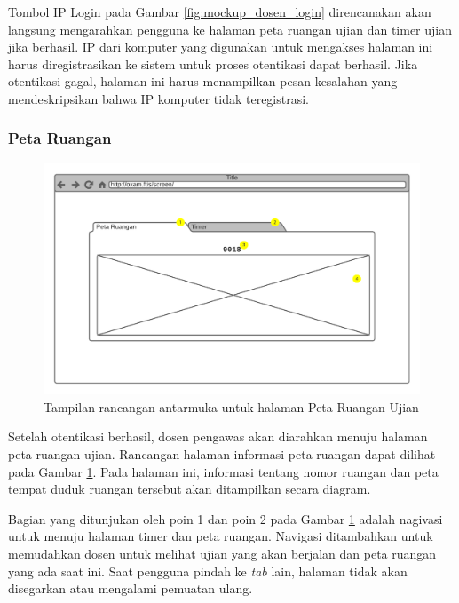     Tombol IP Login pada Gambar \ref{fig:mockup_dosen_login} direncanakan akan langsung mengarahkan 
    pengguna ke halaman peta ruangan ujian dan timer ujian jika berhasil. IP dari komputer yang
    digunakan untuk mengakses halaman ini harus diregistrasikan ke sistem untuk proses otentikasi
    dapat berhasil. Jika otentikasi gagal, halaman ini harus menampilkan pesan kesalahan yang
    mendeskripsikan bahwa IP komputer tidak teregistrasi.
    
\subsubsection{Peta Ruangan}
    \begin{figure}
        \centering
        \includegraphics[width=0.7\paperwidth]{Gambar/mockups/Mockup--DosenPengawas - Seatmap.pdf}
        \caption{Tampilan rancangan antarmuka untuk halaman Peta Ruangan Ujian}
        \label{fig:mockup_dosen_seatmap}
    \end{figure}
    Setelah otentikasi berhasil, dosen pengawas akan diarahkan menuju halaman peta ruangan
    ujian. Rancangan halaman informasi peta ruangan dapat dilihat pada Gambar 
    \ref{fig:mockup_dosen_seatmap}. Pada halaman ini, informasi tentang nomor ruangan dan peta
    tempat duduk ruangan tersebut akan ditampilkan secara diagram.
    
    Bagian yang ditunjukan oleh poin 1 dan poin 2 pada Gambar \ref{fig:mockup_dosen_seatmap}
    adalah nagivasi untuk menuju halaman timer dan peta ruangan. Navigasi ditambahkan untuk 
    memudahkan dosen untuk melihat ujian yang akan berjalan dan peta ruangan yang ada saat ini.
    Saat pengguna pindah ke \textit{tab} lain, halaman tidak akan disegarkan atau mengalami pemuatan
    ulang. 
    
